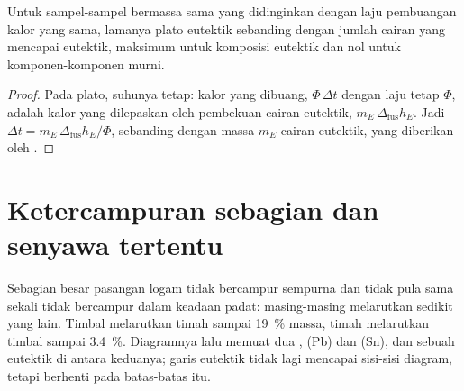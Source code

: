 \begin{proposition}\label{prop:b2:solid-liquid-diagrams:plateau-length}
Untuk sampel-sampel bermassa sama yang didinginkan dengan laju pembuangan
kalor yang sama, lamanya plato eutektik sebanding dengan jumlah cairan
yang mencapai eutektik, maksimum untuk komposisi eutektik dan nol untuk
komponen-komponen murni.
\end{proposition}

\begin{proof}
Pada plato, suhunya tetap: kalor yang dibuang, $\Phi\,\Delta t$ dengan laju
tetap $\Phi$, adalah kalor yang dilepaskan oleh pembekuan cairan eutektik,
$m_E\,\Delta_{\text{fus}}h_E$. Jadi $\Delta t = m_E\,\Delta_{\text{fus}}h_E/
\Phi$, sebanding dengan massa $m_E$ cairan eutektik, yang diberikan oleh
.
\end{proof}

\section{Ketercampuran sebagian dan senyawa tertentu}

Sebagian besar pasangan logam tidak bercampur sempurna dan tidak pula sama
sekali tidak bercampur dalam keadaan padat: masing-masing melarutkan
sedikit yang lain. Timbal melarutkan timah sampai 19~\% massa, timah
melarutkan timbal sampai 3.4~\%. Diagramnya lalu memuat dua ,
(Pb) dan (Sn), dan sebuah eutektik di antara keduanya; garis eutektik tidak
lagi mencapai sisi-sisi diagram, tetapi berhenti pada batas-batas  itu.

